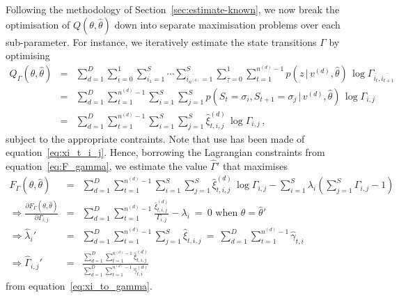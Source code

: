 \documentclass[a4paper]{article}
\begin{document}
Following the methodology of Section~\ref{sec:estimate-known}, we now break the optimisation of $Q(\theta,\hat{\theta})$
down into separate maximisation problems over each sub-parameter.
For instance, we iteratively estimate the state transitions $\Gamma$ by optimising
\begin{eqnarray}
  Q_{\Gamma}(\theta,\hat{\theta}) & = & 
\sum_{d=1}^D
\sum_{\overline{\underline{\iota}}=0}^{1}\sum_{\overline{i_1}=1}^{S}\cdots\sum_{\overline{i_{n^{(d)}}}=1}^{S}
\sum_{\overline{\underline{\tau}}=0}^{1}
\sum_{t=1}^{n^{(d)}-1}p(z\,|\,v^{(d)},\hat{\theta})\,\log\Gamma_{\overline{i_t},\overline{i_{t+1}}}
\nonumber\\& = &
\sum_{d=1}^D\sum_{t=1}^{n^{(d)}-1}
\sum_{i=1}^{S}\sum_{j=1}^{S}
p(S_t\!=\!\sigma_{i},S_{t+1}\!=\!\sigma_j\,|\,v^{(d)},\hat{\theta})\,\log\Gamma_{i,j}
\nonumber\\& = &
\sum_{d=1}^D\sum_{t=1}^{n^{(d)}-1}
\sum_{i=1}^{S}\sum_{j=1}^{S}
\hat{\xi}_{t,i,j}^{(d)}\,\log\Gamma_{i,j}
\,,
\end{eqnarray}
subject to the appropriate contraints. Note that use has been made of equation~\eqref{eq:xi_t_i_j}.
Hence, borrowing the Lagrangian constraints from equation~\eqref{eq:F_gamma}, we estimate the value $\hat{\Gamma}'$ that maximises
\begin{eqnarray}
  F_{\Gamma}(\theta,\hat{\theta}) & = & 
\sum_{d=1}^D\sum_{t=1}^{n^{(d)}-1}
\sum_{i=1}^{S}\sum_{j=1}^{S}
\hat{\xi}_{t,i,j}^{(d)}\,\log\Gamma_{i,j}
-\sum_{i=1}^{S}\lambda_i\left(\sum_{j=1}^{S}\Gamma_{i,j}-1\right)
\\
\Rightarrow
  \frac{\partial F_{\Gamma}(\theta,\hat{\theta})}{\partial\Gamma_{i,j}} & = & 
\sum_{d=1}^D\sum_{t=1}^{n^{(d)}-1}\frac{\hat{\xi}_{t,i,j}^{(d)}}{\Gamma_{i,j}}-\lambda_i
~=~0 \mbox{ when }\theta=\hat{\theta}'
\nonumber\\
\Rightarrow \hat{\lambda}_{i}' & = & \sum_{d=1}^D\sum_{t=1}^{n^{(d)}-1}\sum_{j=1}^{S}\hat{\xi}_{t,i,j}~=~\sum_{d=1}^D\sum_{t=1}^{n^{(d)}-1}\hat{\gamma}_{t,i}
\nonumber\\
\Rightarrow \hat{\Gamma}_{i,j}' & = & 
  \frac{\sum_{d=1}^D\sum_{t=1}^{n^{(d)}-1} \hat{\xi}_{t,i,j}^{(d)}}
          {\sum_{d=1}^D\sum_{t=1}^{n^{(d)}-1} \hat{\gamma}_{t,i}^{(d)}}
\end{eqnarray}
from equation~\eqref{eq:xi_to_gamma}. 
\end{document}

